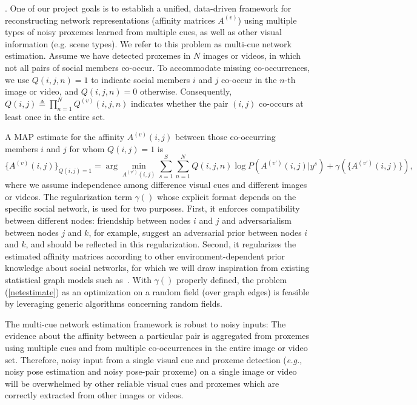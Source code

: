 %


. One of our project goals is to establish a unified, data-driven framework for reconstructing network representations (affinity matrices $A^{(v)}$) using multiple types of noisy proxemes learned from multiple cues, as well as other visual information (e.g. scene types). We refer to this problem as multi-cue network estimation. Assume we have detected proxemes in $N$ images or videos, in which not all pairs of social members co-occur. To accommodate missing co-occurrences, we use $Q(i,j,n)=1$ to indicate social members $i$ and $j$ co-occur in the $n$-th image or video, and $Q(i,j,n)=0$ otherwise. Consequently, $Q(i,j)\triangleq\prod_{n=1}^{N}Q^{(v)}(i,j,n)$ indicates whether the pair $(i, j)$ co-occurs at least once in the entire set.


A MAP estimate for the affinity $A^{(v)}(i,j)$ between those co-occurring members $i$ and $j$ for whom $Q (i,j)=1$ is
\begin{equation}
\{A^{(v)}(i,j)\}_{Q(i,j)=1}=\arg\!\!\!\!\!\min_{A^{(v')}(i,j)}\sum_{s=1}^{S}\sum_{n=1}^{N}Q(i,j,n)\log P(A^{(v')}(i,j)|y^s)+\gamma(\{A^{(v')}(i,j)\}),
\label{netestimate}
\end{equation}
where we assume independence among difference visual cues and different images or videos. The regularization term $\gamma()$ whose explicit format depends on the specific social network, is used for two purposes. First, it enforces compatibility between different nodes: friendship between nodes $i$ and $j$ and adversarialism between nodes $j$ and $k$, for example, suggest an adversarial prior between nodes $i$ and $k$, and should be reflected in this regularization. Second, it regularizes the estimated affinity matrices according to other environment-dependent prior knowledge about social networks, for which we will draw inspiration from existing statistical graph models such as~\cite{Goldenberg}. With $\gamma()$ properly defined, the problem (\ref{netestimate}) as an optimization on a random field (over graph edges) is feasible by leveraging generic algorithms concerning random fields.

The multi-cue network estimation framework is robust to noisy inputs: The evidence about the affinity between a particular pair is aggregated from proxemes using multiple cues and from multiple co-occurrences in the entire image or video set. Therefore, noisy input from a single visual cue and proxeme detection (\emph{e.g.}, noisy pose estimation and noisy pose-pair proxeme) on a single image or video will be overwhelmed by other reliable visual cues and proxemes which are correctly extracted from other images or videos.  

